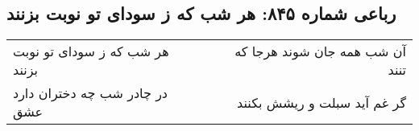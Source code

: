 \begin{center}
\section*{رباعی شماره ۸۴۵: هر شب که ز سودای تو نوبت بزنند}
\label{sec:0845}
\begin{longtable}{l p{0.5cm} r}
هر شب که ز سودای تو نوبت بزنند
&&
آن شب همه جان شوند هرجا که تنند
\\
در چادر شب چه دختران دارد عشق
&&
گر غم آید سبلت و ریشش بکنند
\\
\end{longtable}
\end{center}
